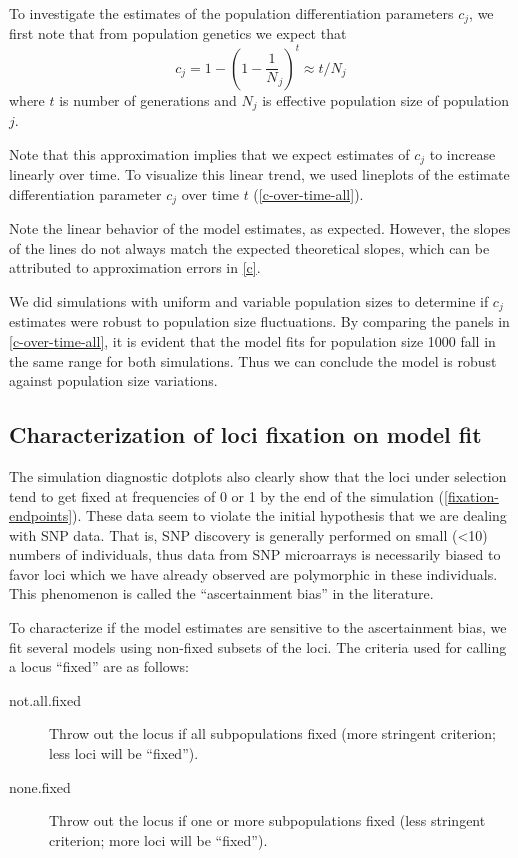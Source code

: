 \documentclass[a4paper,12pt]{article}
\begin{document}
To investigate the estimates of the population differentiation
parameters $c_j$, we first note that from population genetics we
expect that
\begin{equation}
  \label{c}
 c_j = 1 - (1 - \frac 1 N_j)^t\approx t/N_j  
\end{equation}
where $t$ is number of generations and $N_j$ is effective population
size of population $j$.

Note that this approximation implies that we expect estimates of $c_j$
to increase linearly over time. To visualize this linear trend, we
used lineplots of the estimate differentiation parameter $c_j$ over
time $t$ (\autoref{c-over-time-all}).


Note the linear behavior of the model estimates, as expected. However,
the slopes of the lines do not always match the expected theoretical
slopes, which can be attributed to approximation errors in
\autoref{c}.

We did simulations with uniform and variable population sizes to
determine if $c_j$ estimates were robust to population size
fluctuations. By comparing the panels in \autoref{c-over-time-all}, it
is evident that the model fits for population size 1000 fall in the
same range for both simulations. Thus we can conclude the model is
robust against population size variations.

\subsection{Characterization of loci fixation on model fit}

The simulation diagnostic dotplots also clearly show that the loci
under selection tend to get fixed at frequencies of 0 or 1 by the end
of the simulation (\autoref{fixation-endpoints}). These data seem to
violate the initial hypothesis that we are dealing with SNP data. That
is, SNP discovery is generally performed on small (<10) numbers of
individuals, thus data from SNP microarrays is necessarily biased to
favor loci which we have already observed are polymorphic in these
individuals. This phenomenon is called the ``ascertainment bias'' in
the literature.

To characterize if the model estimates are sensitive to the
ascertainment bias, we fit several models using non-fixed subsets of
the loci. The criteria used for calling a locus ``fixed'' are as
follows:
\begin{description}
\item[not.all.fixed] Throw out the locus if all subpopulations fixed
  (more stringent criterion; less loci will be ``fixed'').
\item[none.fixed] Throw out the locus if one or more subpopulations
  fixed (less stringent criterion; more loci will be ``fixed'').
\end{description}
\end{document}
